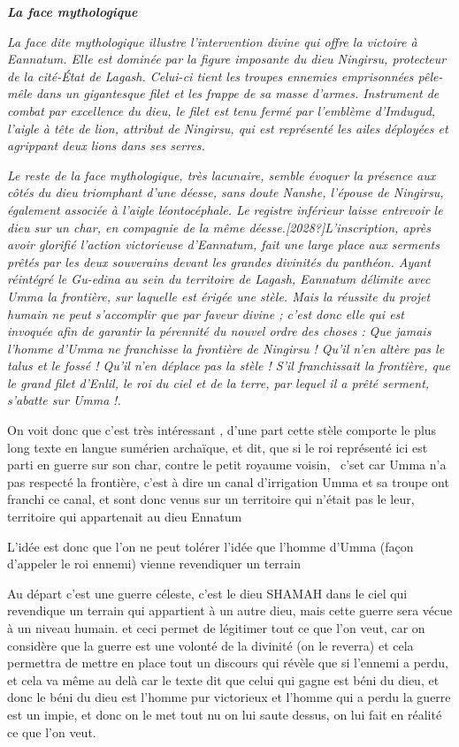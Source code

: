 \documentclass[a4paper]{article}
\begin{document}
\textbf{\textit{La face {\textquotedbl}mythologique{\textquotedbl}}}


\textit{La face dite {\textquotedbl}mythologique{\textquotedbl} illustre l'intervention divine qui offre la victoire à
Eannatum. Elle est dominée par la figure imposante du dieu Ningirsu, protecteur de la cité-État de Lagash. Celui-ci
tient les troupes ennemies emprisonnées pêle-mêle dans un gigantesque filet et les frappe de sa masse d'armes.
Instrument de combat par excellence du dieu, le filet est tenu fermé par l'emblème d'Imdugud, l'aigle à tête de lion,
attribut de Ningirsu, qui est représenté les ailes déployées et agrippant deux lions dans ses serres.}

\textit{Le reste de la face {\textquotedbl}mythologique{\textquotedbl}, très lacunaire, semble évoquer la présence aux
côtés du dieu triomphant d'une déesse, sans doute Nanshe, l'épouse de Ningirsu, également associée à l'aigle
léontocéphale. Le registre inférieur laisse entrevoir le dieu sur un char, en compagnie de la même
déesse.[2028?]L'inscription, après avoir glorifié l'action victorieuse d'Eannatum, fait une large place aux serments
prêtés par les deux souverains devant les grandes divinités du panthéon. Ayant réintégré le Gu-edina au sein du
territoire de Lagash, Eannatum délimite avec Umma la frontière, sur laquelle est érigée une stèle. Mais la réussite du
projet humain ne peut s'accomplir que par faveur divine ; c'est donc elle qui est invoquée afin de garantir la
pérennité du nouvel ordre des choses : {\textquotedbl}}\textit{Que jamais l'homme d'Umma ne franchisse la frontière de
Ningirsu ! Qu'il n'en altère pas le talus et le fossé ! Qu'il n'en déplace pas la stèle ! S'il franchissait la
frontière, que le grand filet d'Enlil, le roi du ciel et de la terre, par lequel il a prêté serment, s'abatte sur Umma
}\textit{!{\textquotedbl}.}


On voit donc que c'est très intéressant , d'une part cette stèle comporte le plus long texte en langue sumérien
archaïque, et dit, que si le roi représenté ici est parti en guerre sur son char, contre le petit royaume voisin,
\ c'set car Umma n'a pas respecté la frontière, c'est à dire un canal d'irrigation Umma et sa troupe ont franchi ce
canal, et sont donc venus sur un territoire qui n'était pas le leur, territoire qui appartenait au dieu Ennatum


L'idée est donc que l'on ne peut tolérer l'idée que l'homme d'Umma (façon d'appeler le roi ennemi) vienne revendiquer un
terrain 

Au départ c'est une guerre céleste, c'est le dieu SHAMAH dans le ciel qui revendique un terrain qui appartient à un
autre dieu, mais cette guerre sera vécue à un niveau humain. et ceci permet de légitimer tout ce que l'on veut, car on
considère que la guerre est une volonté de la divinité (on le reverra) et cela permettra de mettre en place tout un
discours qui révèle que si l'ennemi a perdu, et cela va même au delà car le texte dit que celui qui gagne est béni du
dieu, et donc le béni du dieu est l'homme pur victorieux et l'homme qui a perdu la guerre est un impie, et donc on le
met tout nu on lui saute dessus, on lui fait en réalité ce que l'on veut. 
\end{document}

